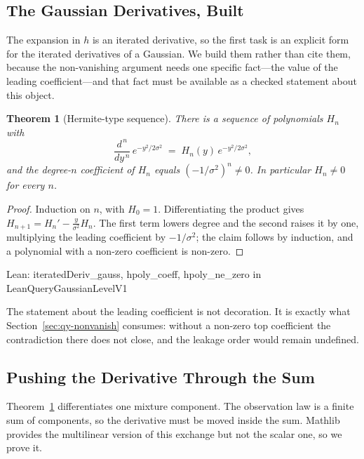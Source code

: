 \documentclass[conference]{IEEEtran}
\newtheorem{theorem}{Theorem}
\theoremstyle{definition}
\newcommand{\lean}[1]{\textsf{\footnotesize #1}}
\newcommand{\leanbox}[1]{%
  \par\vspace{2pt}\noindent
  {\footnotesize\textsf{Lean: #1}}\par\vspace{2pt}}
\begin{document}
\subsection{The Gaussian Derivatives, Built}
\label{sec:qy-hermite}

The expansion in $h$ is an iterated derivative, so the first task is an explicit form for the
iterated derivatives of a Gaussian. We build them rather than cite them, because the
non-vanishing argument needs one specific fact---the value of the leading coefficient---and
that fact must be available as a checked statement about this object.

\begin{theorem}[Hermite-type sequence]
\label{thm:qy-hermite}
There is a sequence of polynomials $H_{n}$ with
\begin{equation}
\frac{d^{\,n}}{dy^{\,n}}\,e^{-y^{2}/2\sigma^{2}}
   \;=\;H_{n}(y)\,e^{-y^{2}/2\sigma^{2}},
\label{eq:qy-hermite}
\end{equation}
and the degree-$n$ coefficient of $H_{n}$ equals $(-1/\sigma^{2})^{n}\neq0$. In particular
$H_{n}\neq0$ for every $n$.
\end{theorem}

\begin{proof}
Induction on $n$, with $H_{0}=1$. Differentiating the product gives
$H_{n+1}=H_{n}'-\tfrac{y}{\sigma^{2}}H_{n}$. The first term lowers degree and the second
raises it by one, multiplying the leading coefficient by $-1/\sigma^{2}$; the claim follows
by induction, and a polynomial with a non-zero coefficient is non-zero.
\end{proof}

\leanbox{\lean{iteratedDeriv\_gauss}, \lean{hpoly\_coeff}, \lean{hpoly\_ne\_zero} in
\lean{LeanQueryGaussianLevelV1}}

The statement about the leading coefficient is not decoration. It is exactly what
Section~\ref{sec:qy-nonvanish} consumes: without a non-zero top coefficient the contradiction
there does not close, and the leakage order would remain undefined.

\subsection{Pushing the Derivative Through the Sum}
\label{sec:qy-assembly}

Theorem~\ref{thm:qy-hermite} differentiates one mixture component. The observation law is a
finite sum of components, so the derivative must be moved inside the sum. Mathlib provides
the multilinear version of this exchange but not the scalar one, so we prove it.
\end{document}
